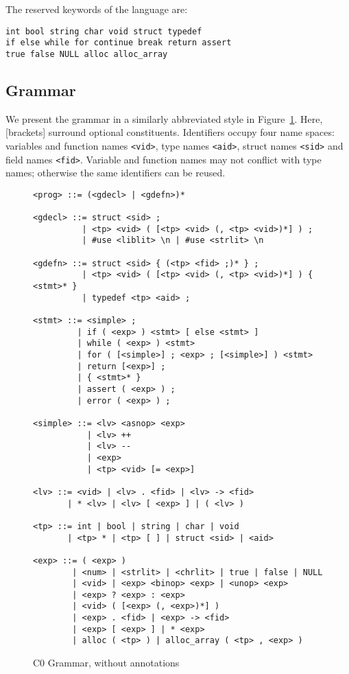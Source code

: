\documentclass[11pt]{article}
\begin{document}
The reserved keywords of the language are:
\begin{verbatim}
int bool string char void struct typedef
if else while for continue break return assert
true false NULL alloc alloc_array
\end{verbatim}

\subsection{Grammar}

We present the grammar in a similarly abbreviated style in
Figure~\ref{fig:grammar}.  Here, [brackets] surround optional
constituents.  Identifiers occupy four name spaces: variables and
function names \verb'<vid>', type names \verb'<aid>', struct names
\verb'<sid>' and field names \verb'<fid>'.  Variable and function
names may not conflict with type names; otherwise the same identifiers
can be reused.

\begin{figure}
\begin{small}
\begin{verbatim}
<prog> ::= (<gdecl> | <gdefn>)*

<gdecl> ::= struct <sid> ;
          | <tp> <vid> ( [<tp> <vid> (, <tp> <vid>)*] ) ;
          | #use <liblit> \n | #use <strlit> \n

<gdefn> ::= struct <sid> { (<tp> <fid> ;)* } ;
          | <tp> <vid> ( [<tp> <vid> (, <tp> <vid>)*] ) { <stmt>* }
          | typedef <tp> <aid> ;

<stmt> ::= <simple> ;
         | if ( <exp> ) <stmt> [ else <stmt> ]
         | while ( <exp> ) <stmt>
         | for ( [<simple>] ; <exp> ; [<simple>] ) <stmt>
         | return [<exp>] ;
         | { <stmt>* }
         | assert ( <exp> ) ;
         | error ( <exp> ) ; 

<simple> ::= <lv> <asnop> <exp>
           | <lv> ++
           | <lv> --
           | <exp>
           | <tp> <vid> [= <exp>]

<lv> ::= <vid> | <lv> . <fid> | <lv> -> <fid>
       | * <lv> | <lv> [ <exp> ] | ( <lv> )

<tp> ::= int | bool | string | char | void
       | <tp> * | <tp> [ ] | struct <sid> | <aid>

<exp> ::= ( <exp> )
        | <num> | <strlit> | <chrlit> | true | false | NULL
        | <vid> | <exp> <binop> <exp> | <unop> <exp>
        | <exp> ? <exp> : <exp>
        | <vid> ( [<exp> (, <exp>)*] )
        | <exp> . <fid> | <exp> -> <fid>
        | <exp> [ <exp> ] | * <exp>
        | alloc ( <tp> ) | alloc_array ( <tp> , <exp> )
\end{verbatim}
\end{small}
\caption{C0 Grammar, without annotations}
\label{fig:grammar}
\end{figure}
\end{document}
